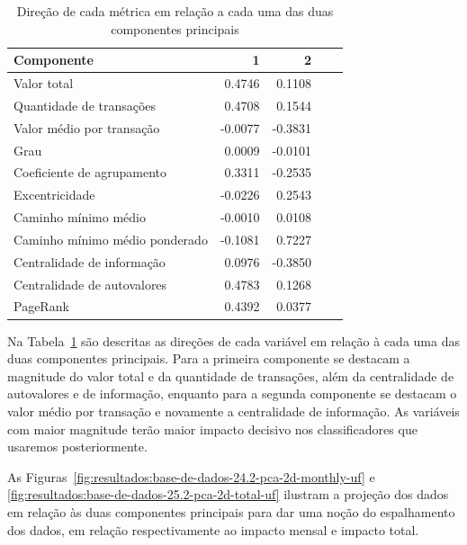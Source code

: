 \begin{table}[htb]
\centering
\caption{Direção de cada métrica em relação a cada uma das duas componentes principais}
\label{tab:resultados:direcao-components-uf}
\begin{tabular}{l|rrrr}
\toprule
Componente & 1 & 2 \\
\midrule
Valor total                    &  0.4746 &  0.1108 \\
Quantidade de transações       &  0.4708 &  0.1544 \\
Valor médio por transação      & -0.0077 & -0.3831 \\
Grau                           &  0.0009 & -0.0101 \\
Coeficiente de agrupamento     &  0.3311 & -0.2535 \\
Excentricidade                 & -0.0226 &  0.2543 \\
Caminho mínimo médio           & -0.0010 &  0.0108 \\
Caminho mínimo médio ponderado & -0.1081 &  0.7227 \\
Centralidade de informação     &  0.0976 & -0.3850 \\
Centralidade de autovalores    &  0.4783 &  0.1268 \\
PageRank                       &  0.4392 &  0.0377 \\
\bottomrule
\end{tabular}
\fdadospesquisa
\end{table}

Na Tabela~\ref{tab:resultados:direcao-components-uf} são descritas as direções de cada variável em relação à cada uma das duas componentes principais. Para a primeira componente se destacam a magnitude do valor total e da quantidade de transações, além da centralidade de autovalores e de informação, enquanto para a segunda componente se destacam o valor médio por transação e novamente a centralidade de informação. As variáveis com maior magnitude terão maior impacto decisivo nos classificadores que usaremos posteriormente.

As Figuras~\ref{fig:resultados:base-de-dados-24.2-pca-2d-monthly-uf} e \ref{fig:resultados:base-de-dados-25.2-pca-2d-total-uf} ilustram a projeção dos dados em relação às duas componentes principais para dar uma noção do espalhamento dos dados, em relação respectivamente ao impacto mensal e impacto total.

